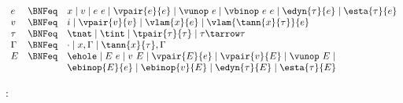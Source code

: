 \begin{flushleft}

\\
$\begin{array}{l c l}
  e & \BNFeq & x \mid v \mid e~e \mid \vpair{e}{e} \mid \vunop~e \mid \vbinop~e~e \mid \edyn{\tau}{e} \mid \esta{\tau}{e}
\\
  v & \BNFeq & i \mid \vpair{v}{v} \mid \vlam{x}{e} \mid \vlam{\tann{x}{\tau}}{e}
\\
  \tau & \BNFeq & \tnat \mid \tint \mid \tpair{\tau}{\tau} \mid \tau \tarrow \tau
\\
  \Gamma & \BNFeq & \cdot \mid x,\Gamma \mid \tann{x}{\tau},\Gamma
\\
  E & \BNFeq & \ehole \mid E~e \mid v~E \mid
                  \vpair{E}{e} \mid \vpair{v}{E} \mid \vunop~E \mid
\\ & &            \ebinop{E}{e} \mid \ebinop{v}{E} \mid \edyn{\tau}{E} \mid \esta{\tau}{E}
\end{array}$

\medskip
{}:\\
\begin{mathpar}









\end{mathpar}


\end{flushleft}
